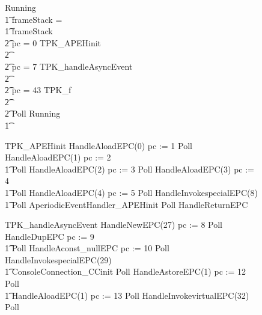 \begin{figure}[p!]
  \setlength{\zedindent}{0cm}
  \setlength{\zedtab}{0.5cm}
  \setlength{\zedleftsep}{0.1cm}
  \begin{circus}
    Running \circdef \\
    \t1 \circif frameStack = \emptyset \circthen \Skip \\
    \t1 {} \circelse frameStack \neq \emptyset \circthen {} \\
    \t2 {} \circif pc = 0 \circthen TPK\_APEHinit \\
    \t2 {} \cdots {} \\
    \t2 {} \circelse pc = 7 \circthen TPK\_handleAsyncEvent \\
    \t2 {} \cdots {} \\
    \t2 {} \circelse pc = 43 \circthen TPK\_f \\
    \t2 {} \cdots {} \\
    \t2 \circfi \circseq Poll \circseq Running \\
    \t1 \circfi
  \end{circus}
  \vspace{-1cm}
  \begin{circus}
    TPK\_APEHinit \circdef HandleAloadEPC(0) \circseq pc := 1 \circseq Poll \circseq HandleAloadEPC(1) \circseq pc := 2 \circseq \\
    \t1 Poll \circseq HandleAloadEPC(2) \circseq pc := 3 \circseq Poll \circseq HandleAloadEPC(3) \circseq pc := 4 \circseq \\
    \t1 Poll \circseq HandleAloadEPC(4) \circseq pc := 5 \circseq Poll \circseq HandleInvokespecialEPC(8) \circseq \\
    \t1 Poll \circseq AperiodicEventHandler\_APEHinit \circseq Poll \circseq HandleReturnEPC \\
  \end{circus}
  \vspace{-1.5cm}
  \begin{circus}
    TPK\_handleAsyncEvent \circdef HandleNewEPC(27) \circseq pc := 8 \circseq Poll \circseq HandleDupEPC \circseq pc := 9 \circseq \\
    \t1 Poll \circseq HandleAconst\_nullEPC \circseq pc := 10 \circseq Poll \circseq HandleInvokespecialEPC(29) \circseq \\
    \t1 ConsoleConnection\_CCinit \circseq Poll \circseq HandleAstoreEPC(1) \circseq pc := 12 \circseq Poll \circseq \\
    \t1 HandleAloadEPC(1) \circseq pc := 13 \circseq Poll \circseq HandleInvokevirtualEPC(32) \circseq Poll \circseq \\

\end{circus}
\end{figure}
